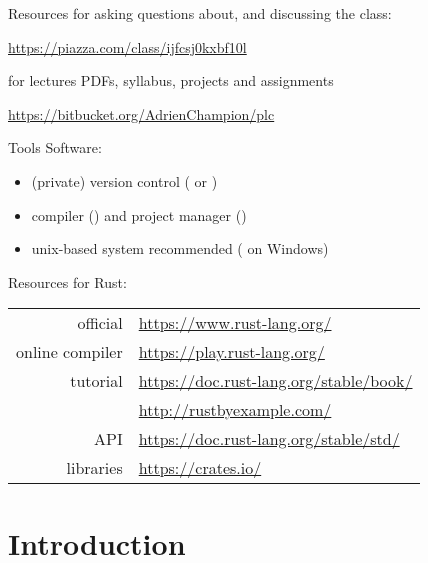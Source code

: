 \documentclass[10pt]{beamer}
\begin{document}
\begin{frame}{Resources}
   for asking questions about, and discussing the class:\\
  \centerline{
    \url{https://piazza.com/class/ijfcsj0kxbf10l}
  }
  \bigskip

   for lectures PDFs, syllabus, projects and assignments\\
  \centerline{
    \url{https://bitbucket.org/AdrienChampion/plc}
  }
\end{frame}




\begin{frame}{Tools}
  Software:
  \medskip
  \begin{itemize}
    \item (private) version control ( or )
    \item {} compiler () and
      project manager ()
    \item unix-based system recommended ( on Windows)
  \end{itemize}
  \bigskip

  \pause

  Resources for Rust:\\
  \medskip
  \begin{tabular}{r l}
    official & \url{https://www.rust-lang.org/} \\
    online compiler & \url{https://play.rust-lang.org/} \\
    tutorial & \url{https://doc.rust-lang.org/stable/book/} \\
    & \url{http://rustbyexample.com/} \\
    API & \url{https://doc.rust-lang.org/stable/std/} \\
    libraries & \url{https://crates.io/} \\
  \end{tabular}
\end{frame}







\section{Introduction}
\end{document}
